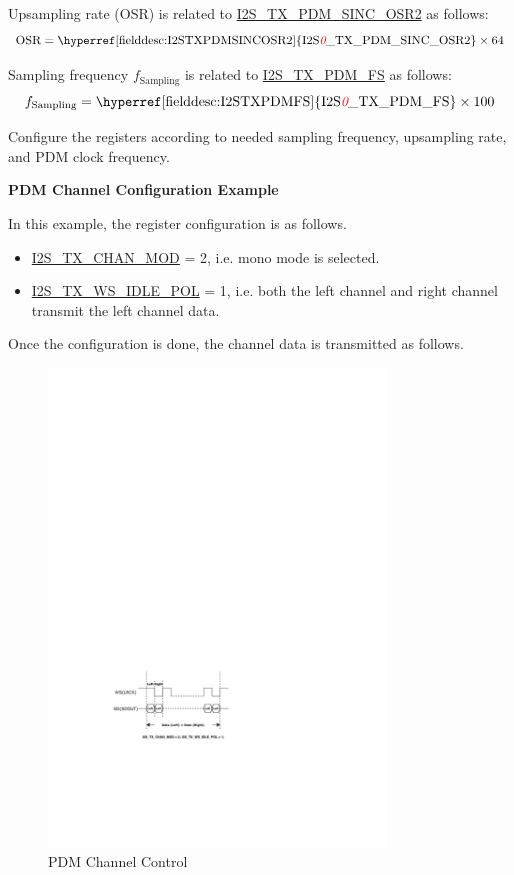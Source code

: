\documentclass[main\_\_CN.tex]{subfiles}
\begin{document}
\begin{itemize}
    Upsampling rate (OSR) is related to \hyperref[fielddesc:I2STXPDMSINCOSR2]{I2S\_TX\_PDM\_SINC\_OSR2} as follows:
    $${\textrm{OSR}} = {\textrm{\hyperref[fielddesc:I2STXPDMSINCOSR2]{I2S\regindex{0}\_TX\_PDM\_SINC\_OSR2}}} \times {\textrm{64}}$$

    Sampling frequency $f_{\textrm{Sampling}}$ is related to \hyperref[fielddesc:I2STXPDMFS]{I2S\_TX\_PDM\_FS} as follows:
    $$f_{\textrm{Sampling}} = {\textrm{\hyperref[fielddesc:I2STXPDMFS]{I2S\regindex{0}\_TX\_PDM\_FS}}} \times {\textrm{100}}$$

    Configure the registers according to needed sampling frequency, upsampling rate, and PDM clock frequency.
\end{itemize}

\textbf{PDM Channel Configuration Example}

In this example, the register configuration is as follows.
\begin{itemize}
    \item \hyperref[fielddesc:I2STXCHANMOD]{ I2S\_TX\_CHAN\_MOD} = 2, i.e. mono mode is selected.
    \item  \hyperref[fielddesc:I2STXWSIDLEPOL]{I2S\_TX\_WS\_IDLE\_POL} = 1, i.e. both the left channel and right channel transmit the left channel data.
\end{itemize}

Once the configuration is done, the channel data is transmitted as follows.

\begin{figure}[H]
    \centering
    \includegraphics[width=0.8\textwidth]{03-I2S/figures/i2s_chan_mode_20220210.pdf}
    \caption{PDM Channel Control}
    \label{Figure:i2s_channel_mode}
\end{figure}
\end{document}
